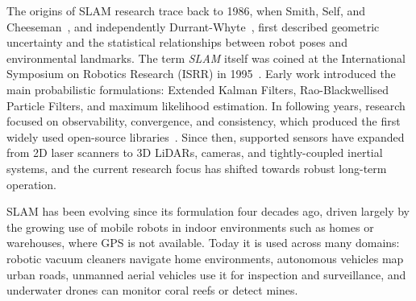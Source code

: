 The origins of SLAM research trace back to 1986, when Smith, Self, and Cheeseman~\cite{smith1990estimating},
and independently Durrant-Whyte~\cite{durrantwhyte1988uncertain}, first described geometric uncertainty and the
statistical relationships between robot poses and environmental
landmarks. The term \emph{SLAM} itself was
coined at the International Symposium on Robotics Research (ISRR) in
1995~\cite{durrant2006simultaneous}.
Early work introduced the main
probabilistic formulations: Extended Kalman Filters, Rao-Blackwellised
Particle Filters, and maximum likelihood estimation.
In following years, research
focused on observability, convergence, and consistency, which produced the
first widely used open-source libraries~\cite{cadena2016past}.
Since then, supported sensors
have expanded from 2D laser scanners to 3D LiDARs, cameras, and
tightly-coupled inertial systems, and the current research focus has shifted
towards robust long-term operation.



SLAM has been evolving since its formulation four decades ago, driven largely by the
growing use of mobile robots in indoor environments such as homes or
warehouses, where GPS is not available. Today it is used across many
domains: robotic vacuum cleaners navigate home environments, autonomous
vehicles map urban roads, unmanned aerial vehicles use it for inspection
and surveillance, and underwater drones can monitor coral reefs or detect mines.


